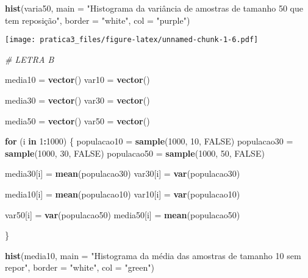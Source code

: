 \documentclass[]{article}
\newenvironment{Shaded}{\begin{snugshade}}{\end{snugshade}}
\newcommand{\KeywordTok}[1]{\textcolor[rgb]{0.13,0.29,0.53}{\textbf{#1}}}
\newcommand{\DataTypeTok}[1]{\textcolor[rgb]{0.13,0.29,0.53}{#1}}
\newcommand{\DecValTok}[1]{\textcolor[rgb]{0.00,0.00,0.81}{#1}}
\newcommand{\StringTok}[1]{\textcolor[rgb]{0.31,0.60,0.02}{#1}}
\newcommand{\CommentTok}[1]{\textcolor[rgb]{0.56,0.35,0.01}{\textit{#1}}}
\newcommand{\OtherTok}[1]{\textcolor[rgb]{0.56,0.35,0.01}{#1}}
\newcommand{\ControlFlowTok}[1]{\textcolor[rgb]{0.13,0.29,0.53}{\textbf{#1}}}
\newcommand{\OperatorTok}[1]{\textcolor[rgb]{0.81,0.36,0.00}{\textbf{#1}}}
\newcommand{\NormalTok}[1]{#1}
\begin{document}
\begin{Shaded}
\begin{Highlighting}[]
\KeywordTok{hist}\NormalTok{(varia50, }\DataTypeTok{main =} \StringTok{"Histograma da variância de amostras de tamanho 50 que tem reposição"}\NormalTok{, }\DataTypeTok{border =} \StringTok{"white"}\NormalTok{, }\DataTypeTok{col =} \StringTok{"purple"}\NormalTok{)}
\end{Highlighting}
\end{Shaded}

\texttt{[image: pratica3\_files/figure-latex/unnamed-chunk-1-6.pdf]}

\begin{Shaded}
\begin{Highlighting}[]
\CommentTok{# LETRA B}


\NormalTok{media10 =}\StringTok{ }\KeywordTok{vector}\NormalTok{()}
\NormalTok{var10 =}\StringTok{ }\KeywordTok{vector}\NormalTok{()}

\NormalTok{media30 =}\StringTok{ }\KeywordTok{vector}\NormalTok{()}
\NormalTok{var30 =}\StringTok{ }\KeywordTok{vector}\NormalTok{()}

\NormalTok{media50 =}\StringTok{ }\KeywordTok{vector}\NormalTok{()}
\NormalTok{var50 =}\StringTok{ }\KeywordTok{vector}\NormalTok{()}

\ControlFlowTok{for}\NormalTok{ (i }\ControlFlowTok{in} \DecValTok{1}\OperatorTok{:}\DecValTok{1000}\NormalTok{) \{}
\NormalTok{  populacao10 =}\StringTok{ }\KeywordTok{sample}\NormalTok{(}\DecValTok{1000}\NormalTok{, }\DecValTok{10}\NormalTok{, }\OtherTok{FALSE}\NormalTok{)}
\NormalTok{  populacao30 =}\StringTok{ }\KeywordTok{sample}\NormalTok{(}\DecValTok{1000}\NormalTok{, }\DecValTok{30}\NormalTok{, }\OtherTok{FALSE}\NormalTok{)}
\NormalTok{  populacao50 =}\StringTok{ }\KeywordTok{sample}\NormalTok{(}\DecValTok{1000}\NormalTok{, }\DecValTok{50}\NormalTok{, }\OtherTok{FALSE}\NormalTok{)}
  
\NormalTok{  media30[i] =}\StringTok{ }\KeywordTok{mean}\NormalTok{(populacao30)}
\NormalTok{  var30[i] =}\StringTok{ }\KeywordTok{var}\NormalTok{(populacao30)}
  
\NormalTok{  media10[i] =}\StringTok{ }\KeywordTok{mean}\NormalTok{(populacao10)}
\NormalTok{  var10[i] =}\StringTok{ }\KeywordTok{var}\NormalTok{(populacao10)}
  
\NormalTok{  var50[i] =}\StringTok{ }\KeywordTok{var}\NormalTok{(populacao50)}
\NormalTok{  media50[i] =}\StringTok{ }\KeywordTok{mean}\NormalTok{(populacao50)}
  
\NormalTok{\}}


\KeywordTok{hist}\NormalTok{(media10, }\DataTypeTok{main =} \StringTok{"Histograma da média das amostras de tamanho 10 sem repor"}\NormalTok{, }\DataTypeTok{border =} \StringTok{"white"}\NormalTok{, }\DataTypeTok{col =} \StringTok{"green"}\NormalTok{)}
\end{Highlighting}
\end{Shaded}
\end{document}
